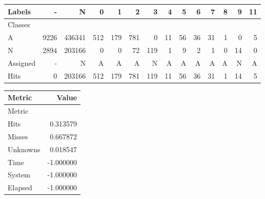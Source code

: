 \begin{tabular}{l|r|r|r|r|r|r|r|r|r|r|r|r|r}

Labels &     - &       N &    0 &    1 &    2 &    3 &   4 &   5 &   6 &   7 &  8 &   9 & 11 \\\hline
Classes  &       &         &      &      &      &      &     &     &     &     &    &     &    \\\hline
\hline
A        &  9226 &  436341 &  512 &  179 &  781 &    0 &  11 &  56 &  36 &  31 &  1 &   0 &  5 \\\hline
N        &  2894 &  203166 &    0 &    0 &   72 &  119 &   1 &   9 &   2 &   1 &  0 &  14 &  0 \\\hline
\hline
Assigned &     - &       N &    A &    A &    A &    N &   A &   A &   A &   A &  A &   N &  A \\\hline
Hits     &     0 &  203166 &  512 &  179 &  781 &  119 &  11 &  56 &  36 &  31 &  1 &  14 &  5 
\end{tabular}
\begin{tabular}{l|r}

Metric   &     Value \\\hline
Metric   &           \\\hline
\hline
Hits     &  0.313579 \\\hline
Misses   &  0.667872 \\\hline
Unknowns &  0.018547 \\\hline
Time     & -1.000000 \\\hline
System   & -1.000000 \\\hline
Elapsed  & -1.000000 
\end{tabular}
